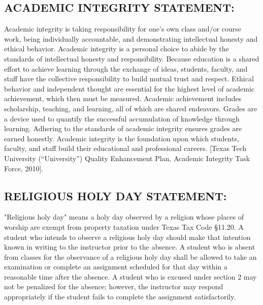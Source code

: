 \documentclass[12pt]{article}
\begin{document}
\subsection*{ACADEMIC INTEGRITY STATEMENT:}
Academic integrity is taking responsibility for one's own class and/or course work, being individually accountable, and demonstrating intellectual honesty and ethical behavior. Academic integrity is a personal choice to abide by the standards of intellectual honesty and responsibility. Because education is a shared effort to achieve learning through the exchange of ideas, students, faculty, and staff have the collective responsibility to build mutual trust and respect. Ethical behavior and independent thought are essential for the highest level of academic achievement, which then must be measured. Academic achievement includes scholarship, teaching, and learning, all of which are shared endeavors. Grades are a device used to quantify the successful accumulation of knowledge through learning. Adhering to the standards of academic integrity ensures grades are earned honestly. Academic integrity is the foundation upon which students, faculty, and staff build their educational and professional careers. [Texas Tech University (“University”) Quality Enhancement Plan, Academic Integrity Task Force, 2010].


\subsection*{RELIGIOUS HOLY DAY STATEMENT:}
"Religious holy day" means a holy day observed by a religion whose places of worship are exempt from property taxation under Texas Tax Code §11.20. A student who intends to observe a religious holy day should make that intention known in writing to the instructor prior to the absence. A student who is absent from classes for the observance of a religious holy day shall be allowed to take an examination or complete an assignment scheduled for that day within a reasonable time after the absence. A student who is excused under section 2 may not be penalized for the absence; however, the instructor may respond appropriately if the student fails to complete the assignment satisfactorily.
\end{document}
